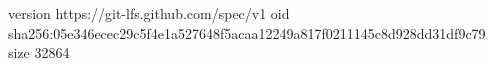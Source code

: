 version https://git-lfs.github.com/spec/v1
oid sha256:05e346ecec29c5f4e1a527648f5acaa12249a817f0211145c8d928dd31df9c79
size 32864

